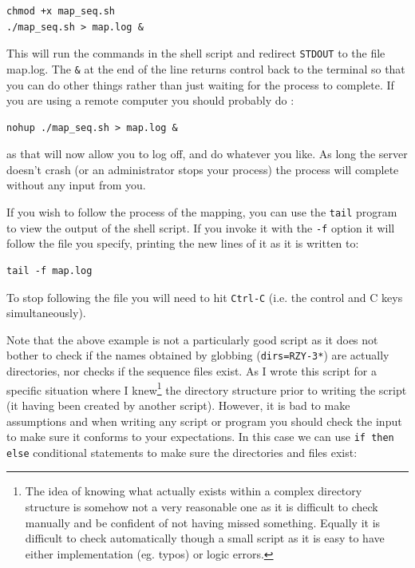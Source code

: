 \documentclass[11pt]{article}
\begin{document}
\begin{verbatim}
chmod +x map_seq.sh
./map_seq.sh > map.log &
\end{verbatim}

This will run the commands in the shell script and redirect \texttt{STDOUT} to the
file map.log. The \texttt{\&} at the end of the line returns control back to the
terminal so that you can do other things rather than just waiting for the
process to complete.
If you are using a remote computer you should probably do :

\begin{verbatim}
nohup ./map_seq.sh > map.log &
\end{verbatim}

as that will now allow you to log off, and do whatever you like. As long the
server doesn't crash (or an administrator stops your process) the process
will complete without any input from you.

If you wish to follow the process of the mapping, you can use the
\texttt{tail} program to view the output of the shell script. If you invoke
it with the \texttt{-f} option it will follow the file you specify, printing
the new lines of it as it is written to:

\begin{verbatim}
tail -f map.log
\end{verbatim}

To stop following the file you will need to hit \texttt{Ctrl-C} (i.e. the
control and C keys simultaneously).

Note that the above example is not a particularly good script as it does
not bother to check if the names obtained by globbing (\texttt{dirs=RZY-3*}) are actually
directories, nor checks if the sequence files exist. As I wrote this script
for a specific situation where I knew\footnote{The idea of knowing what actually exists
within a complex directory structure is somehow not a very reasonable one as it is
difficult to check manually and be confident of not having missed something. Equally
it is difficult to check automatically though a small script as it is easy to have either
implementation (eg. typos) or logic errors.} the directory structure prior to writing
the script (it having been created by another script). However, it is bad to make
assumptions and when writing any script or program you should check the input to make
sure it conforms to your expectations. In this case we can use \texttt{if then else}
conditional statements to make sure the directories and files exist:
\end{document}
